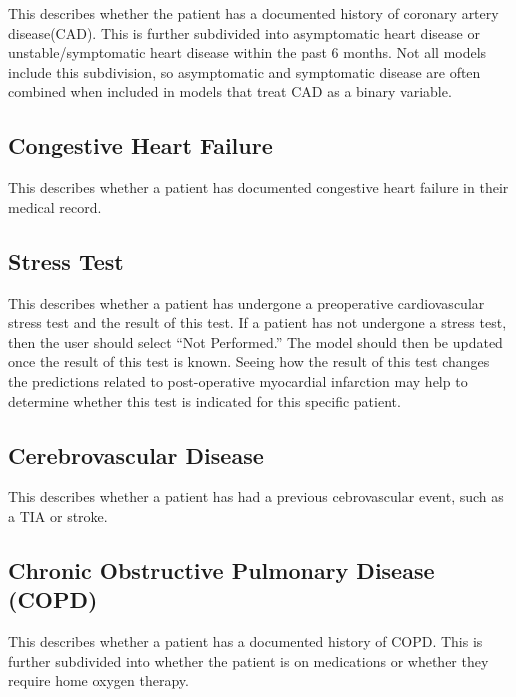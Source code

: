 \documentclass[
]{book}
\begin{document}
This describes whether the patient has a documented history of coronary artery disease(CAD). This is further subdivided into asymptomatic heart disease or unstable/symptomatic heart disease within the past 6 months. Not all models include this subdivision, so asymptomatic and symptomatic disease are often combined when included in models that treat CAD as a binary variable.

\hypertarget{congestive-heart-failure}{%
\subsection{Congestive Heart Failure}\label{congestive-heart-failure}}

This describes whether a patient has documented congestive heart failure in their medical record.

\hypertarget{stress-test}{%
\subsection{Stress Test}\label{stress-test}}

This describes whether a patient has undergone a preoperative cardiovascular stress test and the result of this test. If a patient has not undergone a stress test, then the user should select ``Not Performed.'' The model should then be updated once the result of this test is known. Seeing how the result of this test changes the predictions related to post-operative myocardial infarction may help to determine whether this test is indicated for this specific patient.

\hypertarget{cerebrovascular-disease}{%
\subsection{Cerebrovascular Disease}\label{cerebrovascular-disease}}

This describes whether a patient has had a previous cebrovascular event, such as a TIA or stroke.

\hypertarget{chronic-obstructive-pulmonary-disease-copd}{%
\subsection{Chronic Obstructive Pulmonary Disease (COPD)}\label{chronic-obstructive-pulmonary-disease-copd}}

This describes whether a patient has a documented history of COPD. This is further subdivided into whether the patient is on medications or whether they require home oxygen therapy.
\end{document}
